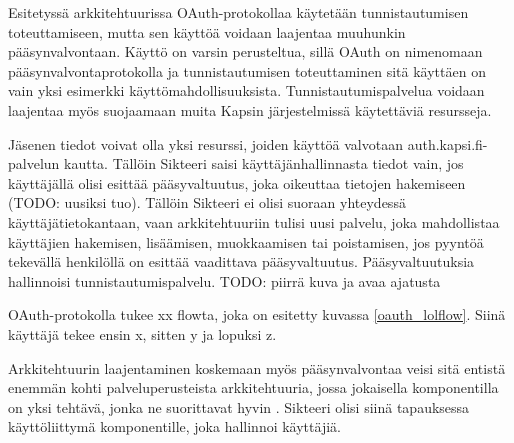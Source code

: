 Esitetyssä arkkitehtuurissa OAuth-protokollaa käytetään tunnistautumisen toteuttamiseen, mutta sen käyttöä voidaan laajentaa muuhunkin pääsynvalvontaan. Käyttö on varsin perusteltua, sillä OAuth on nimenomaan pääsynvalvontaprotokolla ja tunnistautumisen toteuttaminen sitä käyttäen on vain yksi esimerkki käyttömahdollisuuksista. Tunnistautumispalvelua voidaan laajentaa myös suojaamaan muita Kapsin järjestelmissä käytettäviä resursseja.

Jäsenen tiedot voivat olla yksi resurssi, joiden käyttöä valvotaan auth.kapsi.fi-palvelun kautta. Tällöin Sikteeri saisi käyttäjänhallinnasta tiedot vain, jos käyttäjällä olisi esittää pääsyvaltuutus, joka oikeuttaa tietojen hakemiseen (TODO: uusiksi tuo). Tällöin Sikteeri ei olisi suoraan yhteydessä käyttäjätietokantaan, vaan arkkitehtuuriin tulisi uusi palvelu, joka mahdollistaa käyttäjien hakemisen, lisäämisen, muokkaamisen tai poistamisen, jos pyyntöä tekevällä henkilöllä on esittää vaadittava pääsyvaltuutus. Pääsyvaltuutuksia hallinnoisi tunnistautumispalvelu. TODO: piirrä kuva ja avaa ajatusta

OAuth-protokolla tukee xx flowta, joka on esitetty kuvassa \ref{oauth_lolflow}. Siinä käyttäjä tekee ensin x, sitten y ja lopuksi z.

Arkkitehtuurin laajentaminen koskemaan myös pääsynvalvontaa veisi sitä entistä enemmän kohti palveluperusteista arkkitehtuuria, jossa jokaisella komponentilla on yksi tehtävä, jonka ne suorittavat hyvin \cite{soa}. Sikteeri olisi siinä tapauksessa käyttöliittymä komponentille, joka hallinnoi käyttäjiä.